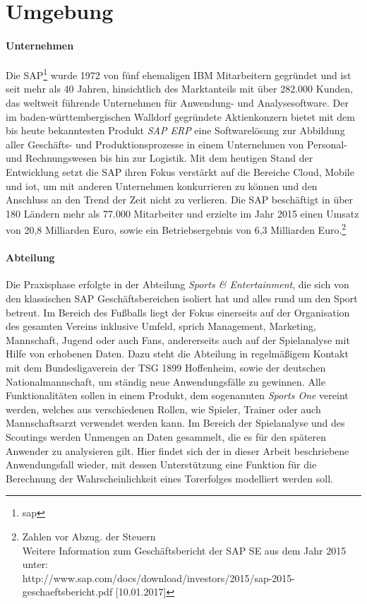 \section{Umgebung}
\paragraph{Unternehmen}
Die SAP\footnote{\gls{sap}} wurde 1972 von fünf ehemaligen IBM Mitarbeitern gegründet und ist seit mehr als 40 Jahren, hinsichtlich des Marktanteils mit über 282.000 Kunden, das weltweit führende Unternehmen für Anwendung- und Analysesoftware. Der im baden-württembergischen Walldorf gegründete Aktienkonzern bietet mit dem bis heute bekanntesten Produkt \textit{SAP ERP} eine Softwarelösung zur Abbildung aller Geschäfts- und Produktionsprozesse in einem Unternehmen von Personal- und Rechnungswesen bis hin zur Logistik. Mit dem heutigen Stand der Entwicklung setzt die SAP ihren Fokus verstärkt auf die Bereiche Cloud, Mobile und \gls{iot}, um mit anderen Unternehmen konkurrieren zu können und den Anschluss an den Trend der Zeit nicht zu verlieren. Die SAP beschäftigt in über 180 Ländern mehr als 77.000 Mitarbeiter und erzielte im Jahr 2015 einen Umsatz von 20,8 Milliarden Euro, sowie ein Betriebsergebnis von 6,3 Milliarden Euro.\footnote{Zahlen vor Abzug. der Steuern\\ Weitere Information zum Geschäftsbericht der SAP SE aus dem Jahr 2015 unter: \\ http://www.sap.com/docs/download/investors/2015/sap-2015-geschaeftsbericht.pdf [10.01.2017]}

\paragraph{Abteilung}
Die Praxisphase erfolgte in der Abteilung \textit{Sports \& Entertainment}, die sich von den klassischen SAP Geschäftsbereichen isoliert hat und alles rund um den Sport betreut. Im Bereich des Fußballs liegt der Fokus einerseits auf der Organisation des gesamten Vereins inklusive Umfeld, sprich Management, Marketing, Mannschaft, Jugend oder auch Fans, andererseits auch auf der Spielanalyse mit Hilfe von erhobenen Daten. Dazu steht die Abteilung in regelmäßigem Kontakt mit dem Bundesligaverein der TSG 1899 Hoffenheim, sowie der deutschen Nationalmannschaft, um ständig neue Anwendungsfälle zu gewinnen. Alle Funktionalitäten sollen in einem Produkt, dem sogenannten \textit{Sports One} vereint werden, welches aus verschiedenen Rollen, wie Spieler, Trainer oder auch Mannschaftsarzt verwendet werden kann. Im Bereich der Spielanalyse und des Scoutings werden Unmengen an Daten gesammelt, die es für den späteren Anwender zu analysieren gilt. Hier findet sich der in dieser Arbeit beschriebene Anwendungsfall wieder, mit dessen Unterstützung eine Funktion für die Berechnung der Wahrscheinlichkeit eines Torerfolges modelliert werden soll.